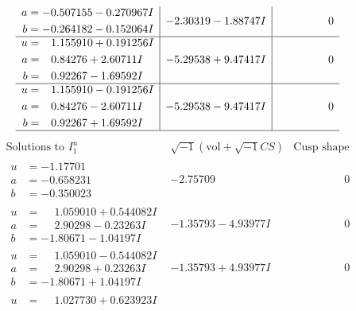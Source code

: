 \documentclass[1p]{elsarticle_modified}
\theoremstyle{definition}
\newcommand{\I}{\sqrt{-1}}
\begin{document}
$$\begin{array}{c|c|c}
\begin{aligned}
a &= -0.507155 - 0.270967 I \\
b &= -0.264182 - 0.152064 I\end{aligned}
 & -2.30319 - 1.88747 I & \phantom{-0.000000 } 0 \\ \hline\begin{aligned}
u &= \phantom{-}1.155910 + 0.191256 I \\
a &= \phantom{-}0.84276 + 2.60711 I \\
b &= \phantom{-}0.92267 - 1.69592 I\end{aligned}
 & -5.29538 + 9.47417 I & \phantom{-0.000000 } 0 \\ \hline\begin{aligned}
u &= \phantom{-}1.155910 - 0.191256 I \\
a &= \phantom{-}0.84276 - 2.60711 I \\
b &= \phantom{-}0.92267 + 1.69592 I\end{aligned}
 & -5.29538 - 9.47417 I & \phantom{-0.000000 } 0\\
 \hline 
 \end{array}$$\newpage$$\begin{array}{c|c|c}  
\text{Solutions to }I^u_{1}& \I (\text{vol} + \sqrt{-1}CS) & \text{Cusp shape}\\
 \hline 
\begin{aligned}
u &= -1.17701\phantom{ +0.000000I} \\
a &= -0.658231\phantom{ +0.000000I} \\
b &= -0.350023\phantom{ +0.000000I}\end{aligned}
 & -2.75709\phantom{ +0.000000I} & \phantom{-0.000000 } 0 \\ \hline\begin{aligned}
u &= \phantom{-}1.059010 + 0.544082 I \\
a &= \phantom{-}2.90298 - 0.23263 I \\
b &= -1.80671 - 1.04197 I\end{aligned}
 & -1.35793 - 4.93977 I & \phantom{-0.000000 } 0 \\ \hline\begin{aligned}
u &= \phantom{-}1.059010 - 0.544082 I \\
a &= \phantom{-}2.90298 + 0.23263 I \\
b &= -1.80671 + 1.04197 I\end{aligned}
 & -1.35793 + 4.93977 I & \phantom{-0.000000 } 0 \\ \hline\begin{aligned}
u &= \phantom{-}1.027730 + 0.623923 I \\

\end{aligned}
\end{array}$$
\end{document}
